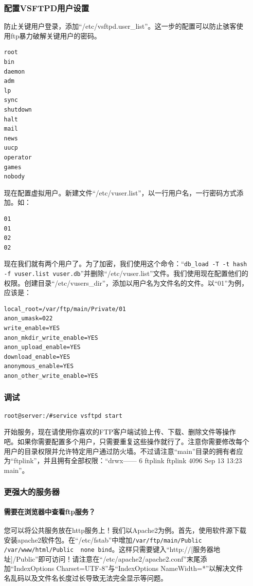 \subsubsection{配置VSFTPD用户设置}
防止关键用户登录，添加“/etc/vsftpd.user\_list”。这一步的配置可以防止骇客使用ftp暴力破解关键用户的密码。
\begin{verbatim}
root
bin
daemon
adm
lp
sync
shutdown
halt
mail
news
uucp
operator
games
nobody
\end{verbatim}\par
现在配置虚拟用户。新建文件“/etc/vuser.list”，以一行用户名，一行密码方式添加。如：
\begin{verbatim}
01
01
02
02
\end{verbatim}\par
现在我们就有两个用户了。为了加密，我们使用这个命令：“\verb|db_load -T -t hash -f vuser.list vuser.db|”并删除“/etc/vuser.list”文件。我们使用现在配置他们的权限。创建目录“/etc/vusers\_dir”，添加以用户名为文件名的文件。以“01”为例，应该是：
\begin{verbatim}
local_root=/var/ftp/main/Private/01
anon_umask=022
write_enable=YES
anon_mkdir_write_enable=YES
anon_upload_enable=YES
download_enable=YES
anonymous_enable=YES
anon_other_write_enable=YES
\end{verbatim}
\subsubsection{调试}
\begin{verbatim}
root@server:/#service vsftpd start
\end{verbatim}\par
开始服务，现在请使用你喜欢的FTP客户端试验上传、下载、删除文件等操作吧。如果你需要配置多个用户，只需要重复这些操作就行了。注意你需要修改每个用户的目录权限并允许特定用户通过防火墙。不过请注意“main”目录的拥有者应为“ftplink”，并且拥有全部权限：“drwx------  6 ftplink ftplink 4096 Sep 13 13:23 main”。
\subsubsection{更强大的服务器}
\paragraph{需要在浏览器中查看ftp服务？}您可以将公共服务放在http服务上！我们以Apache2为例。首先，使用软件源下载安装apache2软件包。在“/etc/fstab”中增加\verb|/var/ftp/main/Public /var/www/html/Public  none bind|。这样只需要键入“http://[服务器地址]/Public”即可访问！请注意在“/etc/apache2/apache2.conf”末尾添加“IndexOptions Charset=UTF-8”与“IndexOptions NameWidth=*”以解决文件名乱码以及文件名长度过长导致无法完全显示等问题。
